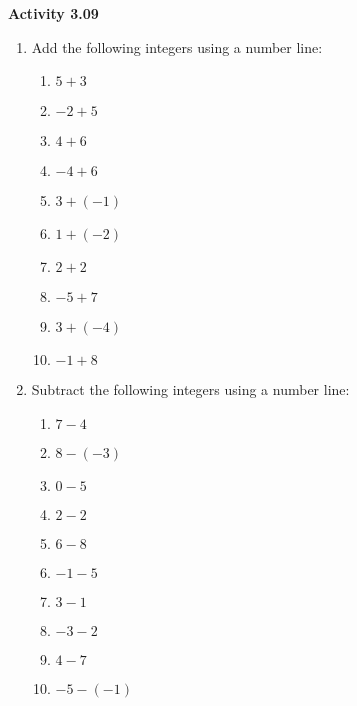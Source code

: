 \vspace{0.3ex}
\noindent\textbf{Activity 3.09}

\vspace{0.2ex}

\begin{enumerate}[noitemsep, label = \color{blue}\Alph*. ]
\item Add the following integers using a number line:
\begin{multicols}{4}
\begin{enumerate}[noitemsep, label = \color{blue}\arabic*. ]
    \item \(5 + 3\)
    \item \(-2 + 5\)
    \item \(4 + 6\)
    \item \(-4 + 6\)
    \item \(3 + (-1)\)
    \item \(1 + (-2)\)
    \item \(2 + 2\)
    \item \(-5 + 7\)
    \item \(3 + (-4)\)
    \item \(-1 + 8\)
\end{enumerate}
\end{multicols}

\item Subtract the following integers using a number line:
\begin{multicols}{3}
\begin{enumerate}[noitemsep, label = \color{blue}\arabic*. ]
    \item \(7 - 4\)
    \item \(8 - (-3)\)
    \item \(0 - 5\)
    \item \(2 - 2\)
    \item \(6 - 8\)
    \item \(-1 - 5\)
    \item \(3 - 1\)
    \item \(-3 - 2\)
    \item \(4 - 7\)
    \item \(-5 - (-1)\)
\end{enumerate}
\end{multicols}
\end{enumerate}
